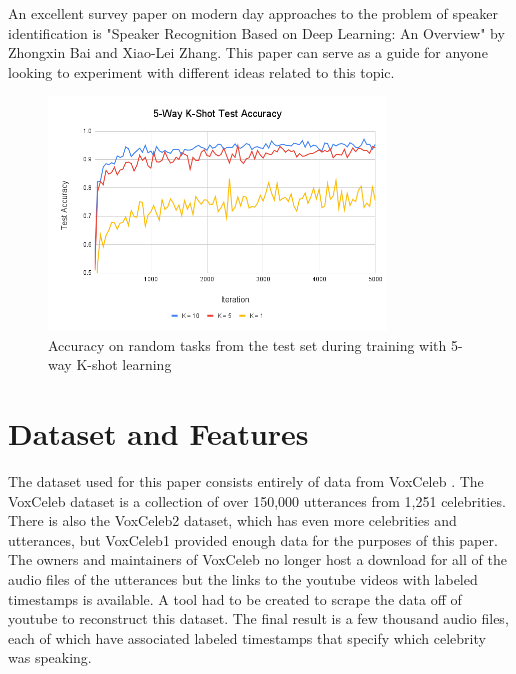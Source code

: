 \documentclass{article}
\begin{document}
An excellent survey paper on modern day approaches to the problem of speaker identification is "Speaker Recognition Based on
Deep Learning: An Overview" \cite{SpeakerRecognitionOverview} by Zhongxin Bai and Xiao-Lei Zhang. This paper can serve as
a guide for anyone looking to experiment with different ideas related to this topic.

\begin{figure}
  \centering
  \includegraphics[width=0.8\textwidth]{Images/5-Way K-Shot Test Accuracy.png}
  \caption{Accuracy on random tasks from the test set during training with 5-way K-shot learning}
  \label{fig:FiveWayAccuracy}
\end{figure}


\section{Dataset and Features}
The dataset used for this paper consists entirely of data from VoxCeleb \cite{DBLP:journals/corr/NagraniCZ17}. The 
VoxCeleb dataset is a collection of over 150,000 utterances from 1,251 celebrities. There is also the VoxCeleb2 \cite{Chung18b} 
dataset, which has even more celebrities and utterances, but VoxCeleb1 provided enough data for the purposes of this paper.
The owners and maintainers of VoxCeleb no longer host a download for all of the audio files of the utterances but the 
links to the youtube videos with labeled timestamps is available. A tool had to be created to scrape the data off of
youtube to reconstruct this dataset. The final result is a few thousand audio files, each of which have associated labeled
timestamps that specify which celebrity was speaking.
\end{document}
